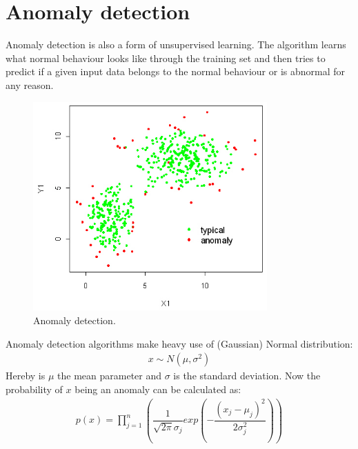 \section{Anomaly detection}
Anomaly detection is also a form of unsupervised learning. The algorithm learns what normal behaviour looks like through the training set and then tries to predict if a given input data belongs to the normal behaviour or is abnormal for any reason.
\begin{figure}[H]
\centering
\includegraphics[width=0.8\textwidth]{Figures/anomaly}
\decoRule
\caption[Anomaly detection]{Anomaly detection. \cite{anomaly-fig}}
\label{fig:anomalydetection}
\end{figure}
\noindent Anomaly detection algorithms make heavy use of (Gaussian) Normal distribution:
\begin{align}
x \sim N(\mu, \sigma^2)
\end{align}
Hereby is $\mu$ the mean parameter and $\sigma$ is the standard deviation. Now the probability of $x$ being an anomaly can be calculated as:
\begin{align}
p(x) = \prod_{j=1}^n( \dfrac{1}{\sqrt{2\pi}\sigma_j} exp(- \dfrac{(x_j - \mu_j)^2}{2\sigma_j^2}) )
\end{align}

